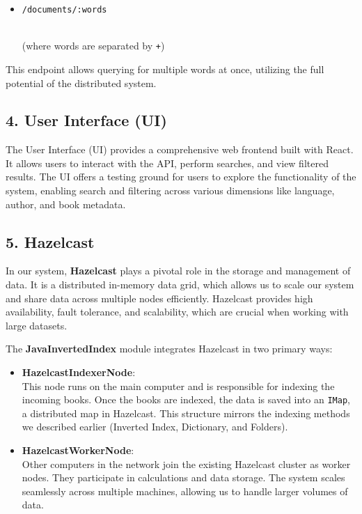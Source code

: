 \begin{itemize}
\tightlist
\item
  \texttt{/documents/:words}\strut \\
  (where words are separated by \texttt{+})
\end{itemize}

This endpoint allows querying for multiple words at once, utilizing the
full potential of the distributed system.

\hypertarget{user-interface-ui}{%
\subsection{4. User Interface (UI)}\label{user-interface-ui}}

The User Interface (UI) provides a comprehensive web frontend built with
React. It allows users to interact with the API, perform searches, and
view filtered results. The UI offers a testing ground for users to
explore the functionality of the system, enabling search and filtering
across various dimensions like language, author, and book metadata.

\hypertarget{hazelcast}{%
\subsection{5. Hazelcast}\label{hazelcast}}

In our system, \textbf{Hazelcast} plays a pivotal role in the storage
and management of data. It is a distributed in-memory data grid, which
allows us to scale our system and share data across multiple nodes
efficiently. Hazelcast provides high availability, fault tolerance, and
scalability, which are crucial when working with large datasets.

The \textbf{JavaInvertedIndex} module integrates Hazelcast in two
primary ways:

\begin{itemize}
\item
  \textbf{HazelcastIndexerNode}:\\
  This node runs on the main computer and is responsible for indexing
  the incoming books. Once the books are indexed, the data is saved into
  an \texttt{IMap}, a distributed map in Hazelcast. This structure
  mirrors the indexing methods we described earlier (Inverted Index,
  Dictionary, and Folders).
\item
  \textbf{HazelcastWorkerNode}:\\
  Other computers in the network join the existing Hazelcast cluster as
  worker nodes. They participate in calculations and data storage. The
  system scales seamlessly across multiple machines, allowing us to
  handle larger volumes of data.
\end{itemize}

